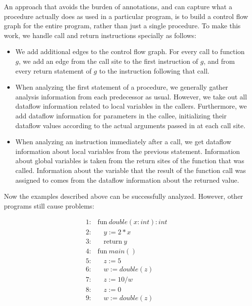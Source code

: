 \documentclass[11pt]{article}
\begin{document}
An approach that avoids the burden of annotations, and can capture what a procedure actually does as used in a particular program, is to build a control flow graph for the entire program, rather than just a single procedure.  To make this work, we handle call and return instructions specially as follows:

\begin{itemize}

\item We add additional edges to the control flow graph.  For every call to function $g$, we add an edge from the call site to the first instruction of $g$, and from every return statement of $g$ to the instruction following that call.

\item When analyzing the first statement of a procedure, we generally gather analysis information from each predecessor as usual.  However, we take out all dataflow information related to local variables in the callers.  Furthermore, we add dataflow information for parameters in the callee, initializing their dataflow values according to the actual arguments passed in at each call site.

\item When analyzing an instruction immediately after a call, we get dataflow information about local variables from the previous statement.  Information about global variables is taken from the return sites of the function that was called.  Information about the variable that the result of the function call was assigned to comes from the dataflow information about the returned value.

\end{itemize}


Now the examples described above can be successfully analyzed.  However, other programs still cause problems:

\[
\begin{array}{ll}
1: & \mbox{fun}~ \textit{double}(x:int):int\\
2: & ~~~~y := 2 * x\\
3: & ~~~~\mbox{return}~ y\\[1ex]

4: & \mbox{fun}~ \textit{main}()\\
5: & ~~~~z := 5\\
6: & ~~~~w := \textit{double}(z)\\
7: & ~~~~z := 10/w\\
8: & ~~~~z := 0\\
9: & ~~~~w := \textit{double}(z)\\[1ex]
\end{array}
\]
\end{document}
